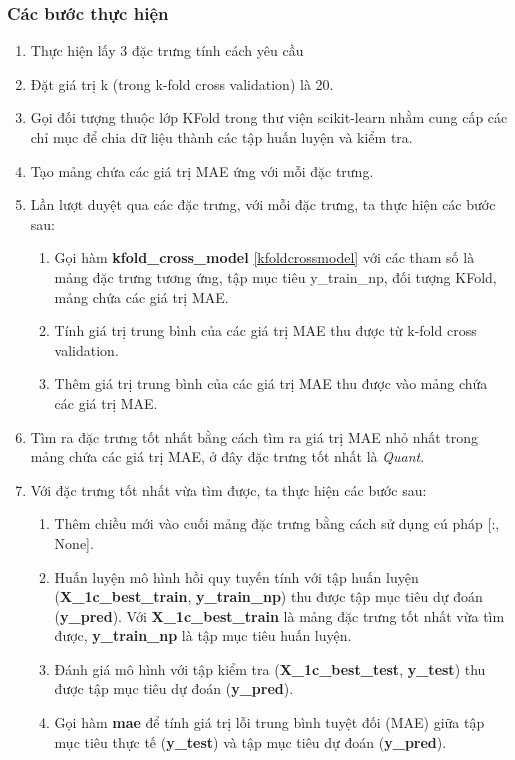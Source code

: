 \documentclass[]{article}
\begin{document}
\subsubsection{Các bước thực hiện}
\begin{enumerate}
  \item Thực hiện lấy 3 đặc trưng tính cách yêu cầu
  \item Đặt giá trị k (trong k-fold cross validation) là 20.
  \item Gọi đối tượng thuộc lớp KFold trong thư viện scikit-learn nhằm cung cấp các chỉ mục để chia dữ liệu thành các tập huấn luyện và kiểm tra. 
  \item Tạo mảng chứa các giá trị MAE ứng với mỗi đặc trưng.
  \item Lần lượt duyệt qua các đặc trưng, với mỗi đặc trưng, ta thực hiện các bước sau:
  \begin{enumerate}
    \item Gọi hàm \textbf{kfold\_cross\_model} \ref{kfoldcrossmodel} với các tham số là mảng đặc trưng tương ứng, tập mục tiêu y\_train\_np, đối tượng KFold, mảng chứa các giá trị MAE.
    \item Tính giá trị trung bình của các giá trị MAE thu được từ k-fold cross validation.
    \item Thêm giá trị trung bình của các giá trị MAE thu được vào mảng chứa các giá trị MAE.
  \end{enumerate}
  \item Tìm ra đặc trưng tốt nhất bằng cách tìm ra giá trị MAE nhỏ nhất trong mảng chứa các giá trị MAE, ở đây đặc trưng tốt nhất là \textit{Quant}.
  \item Với đặc trưng tốt nhất vừa tìm được, ta thực hiện các bước sau:
  \begin{enumerate}
    \item Thêm chiều mới vào cuối mảng đặc trưng bằng cách sử dụng cú pháp [:, None].
    \item Huấn luyện mô hình hồi quy tuyến tính với tập huấn luyện (\textbf{X\_1c\_best\_train}, \textbf{y\_train\_np}) thu được tập mục tiêu dự đoán (\textbf{y\_pred}). Với \textbf{X\_1c\_best\_train} là mảng đặc trưng tốt nhất vừa tìm được, \textbf{y\_train\_np} là tập mục tiêu huấn luyện.
    \item Đánh giá mô hình với tập kiểm tra (\textbf{X\_1c\_best\_test}, \textbf{y\_test}) thu được tập mục tiêu dự đoán (\textbf{y\_pred}).
    \item Gọi hàm \textbf{mae} để tính giá trị lỗi trung bình tuyệt đối (MAE) giữa tập mục tiêu thực tế (\textbf{y\_test}) và tập mục tiêu dự đoán (\textbf{y\_pred}).
  \end{enumerate}
\end{enumerate}
\end{document}
